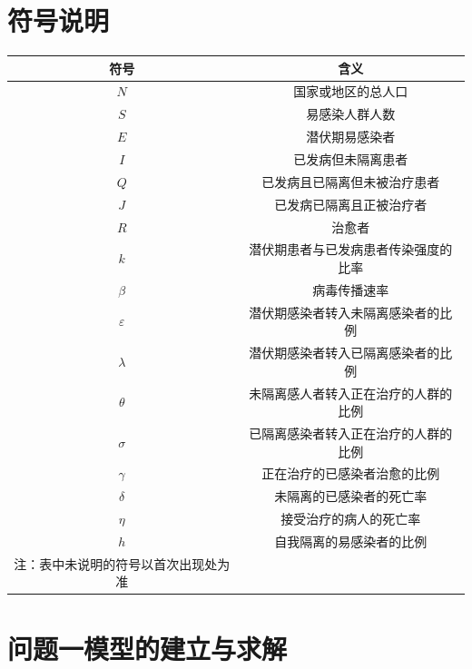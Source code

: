 \documentclass{whutmod}
\begin{document}
\section{符号说明}
\begin{center}
	\begin{tabular}{cc}
		\toprule[1.5pt]
		符号 & 含义\\
		\midrule[1pt]
        $N$ &国家或地区的总人口\\
		$S$ & 易感染人群人数\\
		$E$ & 潜伏期易感染者\\
		$I$ &已发病但未隔离患者\\
		$Q$ &已发病且已隔离但未被治疗患者\\
		$J$ & 已发病已隔离且正被治疗者\\
		$R$ & 治愈者\\
		$k$ & 潜伏期患者与已发病患者传染强度的比率\\
           $\beta$ & 病毒传播速率\\
		$\varepsilon$ &潜伏期感染者转入未隔离感染者的比例\\
           $\lambda$ &潜伏期感染者转入已隔离感染者的比例\\
           $\theta$  &未隔离感人者转入正在治疗的人群的比例\\
           $\sigma$  &已隔离感染者转入正在治疗的人群的比例\\
           $\gamma$ &正在治疗的已感染者治愈的比例\\
           $\delta$  &未隔离的已感染者的死亡率\\
           $\eta $   &接受治疗的病人的死亡率\\
           $ h $   &自我隔离的易感染者的比例\\
		\bottomrule[1.5pt]
		注：表中未说明的符号以首次出现处为准
	\end{tabular}
\end{center}




\section{问题一模型的建立与求解}
\end{document}
